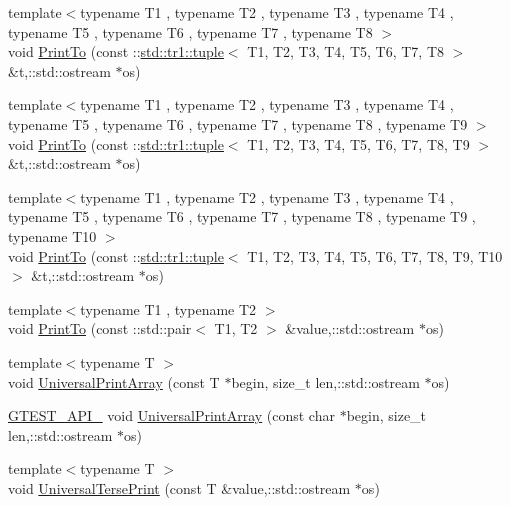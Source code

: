 \begin{DoxyCompactItemize}
\item 
{\footnotesize template$<$typename T1 , typename T2 , typename T3 , typename T4 , typename T5 , typename T6 , typename T7 , typename T8 $>$ }\\void \hyperlink{namespacetesting_1_1internal_a0f47a6e3634be969039e1e6eb902934f}{\-Print\-To} (const \-::\hyperlink{classstd_1_1tr1_1_1tuple}{std\-::tr1\-::tuple}$<$ \-T1, \-T2, \-T3, \-T4, \-T5, \-T6, \-T7, \-T8 $>$ \&t,\-::std\-::ostream $\ast$os)
\item 
{\footnotesize template$<$typename T1 , typename T2 , typename T3 , typename T4 , typename T5 , typename T6 , typename T7 , typename T8 , typename T9 $>$ }\\void \hyperlink{namespacetesting_1_1internal_ad15d6fe963a626de83caee897c8221bc}{\-Print\-To} (const \-::\hyperlink{classstd_1_1tr1_1_1tuple}{std\-::tr1\-::tuple}$<$ \-T1, \-T2, \-T3, \-T4, \-T5, \-T6, \-T7, \-T8, \-T9 $>$ \&t,\-::std\-::ostream $\ast$os)
\item 
{\footnotesize template$<$typename T1 , typename T2 , typename T3 , typename T4 , typename T5 , typename T6 , typename T7 , typename T8 , typename T9 , typename T10 $>$ }\\void \hyperlink{namespacetesting_1_1internal_ab4c216410a9d9080b63f19a31a18c76a}{\-Print\-To} (const \-::\hyperlink{classstd_1_1tr1_1_1tuple}{std\-::tr1\-::tuple}$<$ \-T1, \-T2, \-T3, \-T4, \-T5, \-T6, \-T7, \-T8, \-T9, \-T10 $>$ \&t,\-::std\-::ostream $\ast$os)
\item 
{\footnotesize template$<$typename T1 , typename T2 $>$ }\\void \hyperlink{namespacetesting_1_1internal_a29508e1b1e55eb50775c69a8cdeb68c1}{\-Print\-To} (const \-::std\-::pair$<$ \-T1, \-T2 $>$ \&value,\-::std\-::ostream $\ast$os)
\item 
{\footnotesize template$<$typename T $>$ }\\void \hyperlink{namespacetesting_1_1internal_a5a0f5162309823ca1cc9d43607eae2a5}{\-Universal\-Print\-Array} (const \-T $\ast$begin, size\-\_\-t len,\-::std\-::ostream $\ast$os)
\item 
\hyperlink{gtest-port_8h_aa73be6f0ba4a7456180a94904ce17790}{\-G\-T\-E\-S\-T\-\_\-\-A\-P\-I\-\_\-} void \hyperlink{namespacetesting_1_1internal_acb49eae17314fc8f2a6b617fa4205fe6}{\-Universal\-Print\-Array} (const char $\ast$begin, size\-\_\-t len,\-::std\-::ostream $\ast$os)
\item 
{\footnotesize template$<$typename T $>$ }\\void \hyperlink{namespacetesting_1_1internal_ae988148fb759e91d32a2908b3542b25b}{\-Universal\-Terse\-Print} (const \-T \&value,\-::std\-::ostream $\ast$os)

\end{DoxyCompactItemize}
